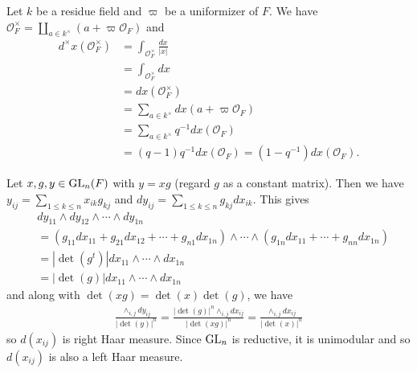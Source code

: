 \begin{problem}
Let $k$ be a residue field and $\varpi$ be a uniformizer of $F$.
We have $\mathcal{O}_{F}^{\times} = \coprod_{a\in k^{\times}} (a + \varpi \mathcal{O}_{F})$ and
\begin{align*}
    d^{\times}x(\mathcal{O}_{F}^{\times}) &= \int_{\mathcal{O}_{F}^{\times}} \frac{dx}{|x|} \\
    &= \int_{\mathcal{O}_{F}^{\times}} dx \\
    &= dx(\mathcal{O}_{F}^{\times}) \\
    &= \sum_{a\in k^{\times}} dx(a + \varpi \mathcal{O}_{F}) \\
    &= \sum_{a\in k^{\times}} q^{-1}dx(\mathcal{O}_{F}) \\
    &= (q - 1)q^{-1}dx(\mathcal{O}_{F}) = (1 - q^{-1}) dx(\mathcal{O}_F).
\end{align*}
\end{problem}

\begin{problem} \notfinish
\end{problem}
\begin{problem} \notfinish
\end{problem}
\begin{problem} \notfinish
\end{problem}

\begin{problem}
Let $x, g, y \in \operatorname{\mathrm{GL}}_n(F)$ with $y = xg$ (regard $g$ as a constant matrix).
Then we have $y_{ij} = \sum_{1\leq k \leq n} x_{ik}g_{kj}$ and $dy_{ij} = \sum_{1\leq k \leq n} g_{kj}dx_{ik}$.
This gives
\begin{align*}
&dy_{11} \wedge dy_{12} \wedge \cdots \wedge dy_{1n} \\
&= (g_{11}dx_{11} + g_{21}dx_{12} + \cdots + g_{n1}dx_{1n}) \wedge \cdots \wedge (g_{1n}dx_{11} + \cdots + g_{nn}dx_{1n}) \\
&= |\det(g^{t})| dx_{11} \wedge \cdots \wedge dx_{1n} \\
&= |\det(g)| dx_{11} \wedge \cdots \wedge dx_{1n}
\end{align*}
and along with $\det(xg) = \det(x) \det(g)$, we have
\begin{align*}
    \frac{\wedge_{i, j}dy_{ij}}{|\det(y)|^{n}} = \frac{|\det(g)|^{n} \wedge_{i, j} dx_{ij}}{|\det(xg)|^{n}} = \frac{\wedge_{i, j} dx_{ij}}{|\det(x)|^{n}}
\end{align*}
so $d(x_{ij})$ is right Haar measure. Since $\operatorname{\mathrm{GL}}_{n}$ is reductive, it is unimodular and so $d(x_{ij})$ is also a left Haar measure.
\end{problem}

